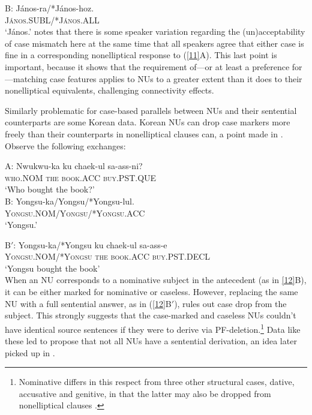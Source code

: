 \documentclass[output=paper
                ,modfonts
                ,nonflat
	        ,collection
	        ,collectionchapter
	        ,collectiontoclongg
 	        ,biblatex
                ,babelshorthands
                ,newtxmath
                ,draftmode
                ,colorlinks, citecolor=brown
]{./langsci/langscibook}
\begin{document}
{B: \gll J\'{a}nos-ra/*J\'{a}nos-hoz.\\
\textsc{J\'{a}nos.SUBL/*J\'{a}nos.ALL}\\
\glt  `J\'{a}nos.'\label{11}\z
\citet{Jacobson2016} notes that there is some speaker variation regarding the (un)ac\-cepta\-bi\-li\-ty of case mismatch here at the same time that all speakers agree that either case is fine in a corresponding nonelliptical response to (\ref{11}A). This last point is important, because it shows that the requirement of---or at least a preference for---matching case features applies to NUs to a greater extent than it does to their nonelliptical equivalents, challenging connectivity effects.

Similarly problematic for case-based parallels between NUs and their sentential counterparts are some Korean data. Korean NUs can drop case markers more freely than their counterparts in nonelliptical clauses can, a point made in \citet{Morgan1989}. Observe the following exchanges:

  \ea
A: \gll Nwukwu-ka ku  chaek-ul  sa-ass-ni?\\
\textsc{who.NOM} \textsc{the} \textsc{book.ACC} \textsc{buy.PST.QUE}\\
\glt  `Who bought the book?'\\

B: \gll Yongsu-ka/Yongsu/*Yongsu-lul.\\
\textsc{Yongsu.NOM/Yongsu/*Yongsu.ACC}\\
\glt  `Yongsu.'

B$'$: \gll Yongsu-ka/*Yongsu  ku  chaek-ul  sa-ass-e\\
\textsc{Yongsu.NOM/*Yongsu} \textsc{the} \textsc{book.ACC} \textsc{buy.PST.DECL}\\
\glt  `Yongsu bought the book'\\
\label{12}\z
%
When an NU corresponds to a nominative subject in the antecedent (as in \ref{12}B), it can be either marked for nominative or caseless.
However, replacing the same NU with a full sentential answer, as in (\ref{12}B$'$), rules out case drop from the subject. This strongly suggests that the case-marked and caseless NUs couldn't have identical source sentences if they were to derive via PF-deletion.\footnote{Nominative differs in this respect from three other structural cases, dative, accusative and genitive, in that the latter may also be dropped from nonelliptical clauses \citep[see][]{Morgan1989, Lee2016, Kim2016}.}  Data like these led \citet{Morgan1989} to propose that not all NUs have a sentential derivation, an idea later picked up in \citet{Barton1998}.

}
\end{document}
